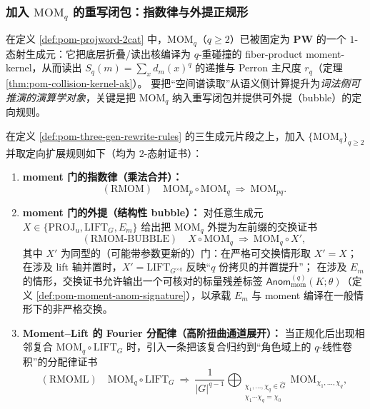 \subsubsection{加入 \texorpdfstring{$\mathrm{MOM}_q$}{MOMq} 的重写闭包：指数律与外提正规形}\label{subsec:pom-mom-rewrite-normal}

在定义 \ref{def:pom-projword-2cat} 中，\(\mathrm{MOM}_q\)（\(q\ge 2\)）已被固定为 \(\mathbf{PW}\) 的一个 \(1\)-态射生成元：它把底层折叠/读出核编译为 \(q\)-重碰撞的 fiber-product moment-kernel，从而读出 \(S_q(m)=\sum_x d_m(x)^q\) 的递推与 Perron 主尺度 \(r_q\)（定理 \ref{thm:pom-collision-kernel-ak}）。
要把“空间谱读取”从语义侧计算提升为\emph{词法侧可推演的演算学对象}，关键是把 \(\mathrm{MOM}_q\) 纳入重写闭包并提供可外提（bubble）的定向规则。

\begin{definition}\label{def:pom-four-gen-rewrite-rules}
在定义 \ref{def:pom-three-gen-rewrite-rules} 的三生成元片段之上，加入 \(\{\mathrm{MOM}_q\}_{q\ge 2}\) 并取定向扩展规则如下（均为 \(2\)-态射证书）：
\begin{enumerate}
  \item \textbf{moment 门的指数律（乘法合并）：}
  $$
  (\mathrm{RMOM})\quad
  \mathrm{MOM}_p\circ \mathrm{MOM}_q\ \Rightarrow\ \mathrm{MOM}_{pq}.
  $$
  \item \textbf{moment 门的外提（结构性 bubble）：}
  对任意生成元 \(X\in\{\mathrm{PROJ}_u,\mathrm{LIFT}_G,E_m\}\) 给出把 \(\mathrm{MOM}_q\) 外提为左前缀的交换证书
  $$
  (\mathrm{RMOM\text{-}BUBBLE})\quad
  X\circ \mathrm{MOM}_q\ \Rightarrow\ \mathrm{MOM}_q\circ X',
  $$
  其中 \(X'\) 为同型的（可能带参数更新的）门：在严格可交换情形取 \(X'=X\)；
  在涉及 lift 轴并置时，\(X'=\mathrm{LIFT}_{G^{\times q}}\) 反映“\(q\) 份拷贝的并置提升”；
  在涉及 \(E_m\) 的情形，交换证书允许输出一个可核对的标量残差标签
  \(\mathsf{Anom}^{(q)}_{\mathrm{mom}}(K;\theta)\)（定义 \ref{def:pom-moment-anom-signature}），以承载 \(E_m\) 与 moment 编译在一般情形下的非严格交换。
  \item \textbf{Moment--Lift 的 Fourier 分配律（高阶扭曲通道展开）：}
  当正规化后出现相邻复合 \(\mathrm{MOM}_q\circ \mathrm{LIFT}_G\) 时，引入一条把该复合归约到“角色域上的 \(q\)-线性卷积”的分配律证书
  \[
  (\mathrm{RMOML})\quad
  \mathrm{MOM}_q\circ \mathrm{LIFT}_G
  \ \Rightarrow\
  \frac{1}{|G|^{q-1}}
  \bigoplus_{\substack{\chi_1,\dots,\chi_q\in\widehat G\\ \chi_1\cdots\chi_q=\chi_0}}
  \mathrm{MOM}_{\chi_1,\dots,\chi_q},
\]
\end{enumerate}
\end{definition}
